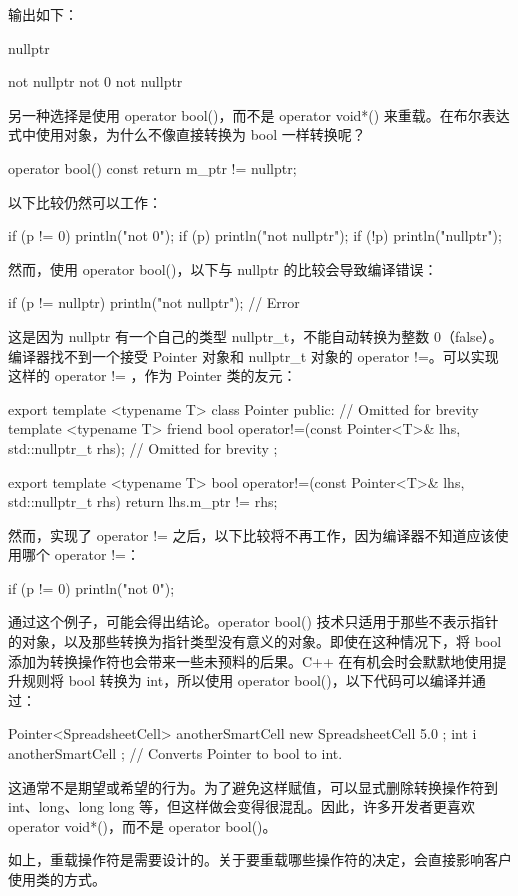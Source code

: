输出如下：

\begin{shell}
nullptr

not nullptr
not 0
not nullptr
\end{shell}

另一种选择是使用 operator bool()，而不是 operator void*() 来重载。在布尔表达式中使用对象，为什么不像直接转换为 bool 一样转换呢？

\begin{cpp}
operator bool() const { return m_ptr != nullptr; }
\end{cpp}

以下比较仍然可以工作：

\begin{cpp}
if (p != 0) { println("not 0"); }
if (p)      { println("not nullptr"); }
if (!p)     { println("nullptr"); }
\end{cpp}

然而，使用 operator bool()，以下与 nullptr 的比较会导致编译错误：

\begin{cpp}
if (p != nullptr) { println("not nullptr"); } // Error
\end{cpp}

这是因为 nullptr 有一个自己的类型 nullptr\_t，不能自动转换为整数 0（false）。编译器找不到一个接受 Pointer 对象和 nullptr\_t 对象的 operator !=。可以实现这样的 operator != ，作为 Pointer 类的友元：

\begin{cpp}
export template <typename T>
class Pointer
{
    public:
        // Omitted for brevity
        template <typename T>
        friend bool operator!=(const Pointer<T>& lhs, std::nullptr_t rhs);
        // Omitted for brevity
};

export template <typename T>
bool operator!=(const Pointer<T>& lhs, std::nullptr_t rhs)
{
    return lhs.m_ptr != rhs;
}
\end{cpp}

然而，实现了 operator != 之后，以下比较将不再工作，因为编译器不知道应该使用哪个 operator !=：

\begin{cpp}
if (p != 0) { println("not 0"); }
\end{cpp}

通过这个例子，可能会得出结论。operator bool() 技术只适用于那些不表示指针的对象，以及那些转换为指针类型没有意义的对象。即使在这种情况下，将 bool 添加为转换操作符也会带来一些未预料的后果。C++ 在有机会时会默默地使用提升规则将 bool 转换为 int，所以使用 operator bool()，以下代码可以编译并通过：

\begin{cpp}
Pointer<SpreadsheetCell> anotherSmartCell { new SpreadsheetCell { 5.0 } };
int i { anotherSmartCell }; // Converts Pointer to bool to int.
\end{cpp}

这通常不是期望或希望的行为。为了避免这样赋值，可以显式删除转换操作符到 int、long、long long 等，但这样做会变得很混乱。因此，许多开发者更喜欢 operator void*()，而不是 operator bool()。

如上，重载操作符是需要设计的。关于要重载哪些操作符的决定，会直接影响客户使用类的方式。

